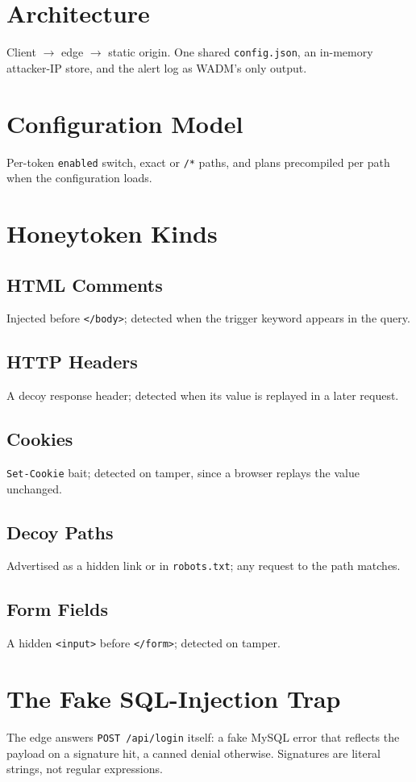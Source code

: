 \documentclass{rptuma}
\begin{document}
\section{Architecture}
Client $\rightarrow$ edge $\rightarrow$ static origin. One shared \texttt{config.json}, an
in-memory attacker-IP store, and the alert log as WADM's only output.

\section{Configuration Model}
Per-token \texttt{enabled} switch, exact or \texttt{/*} paths, and plans precompiled per path when
the configuration loads.

\section{Honeytoken Kinds}
\subsection{HTML Comments}
Injected before \texttt{</body>}; detected when the trigger keyword appears in the query.
\subsection{HTTP Headers}
A decoy response header; detected when its value is replayed in a later request.
\subsection{Cookies}
\texttt{Set-Cookie} bait; detected on tamper, since a browser replays the value unchanged.
\subsection{Decoy Paths}
Advertised as a hidden link or in \texttt{robots.txt}; any request to the path matches.
\subsection{Form Fields}
A hidden \texttt{<input>} before \texttt{</form>}; detected on tamper.

\section{The Fake SQL-Injection Trap}
The edge answers \texttt{POST /api/login} itself: a fake MySQL error that reflects the payload on a
signature hit, a canned denial otherwise. Signatures are literal strings, not regular expressions.
\end{document}
